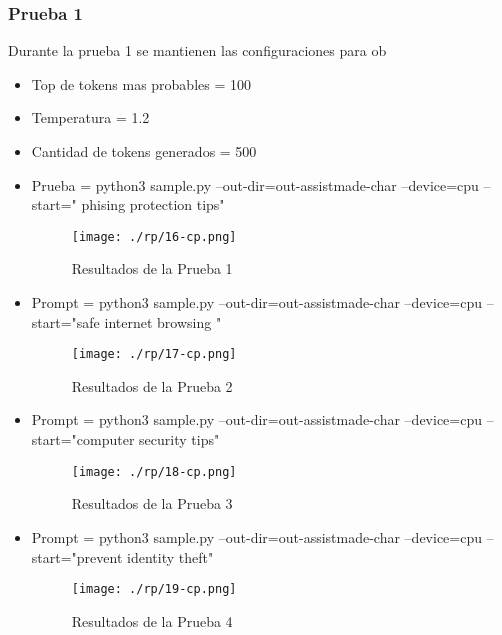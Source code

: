 \subsubsection{ Prueba 1}\label{section:Validación del prototipo}
Durante la prueba 1 se mantienen las configuraciones para ob
    \begin{itemize}
        \item   Top de tokens mas probables = 100
        \item   Temperatura = 1.2
        \item   Cantidad de tokens generados = 500
        \item   Prueba = python3 sample.py --out-dir=out-assistmade-char --device=cpu --start=" phising protection tips"
    
\begin{figure}[H]
   \centering %
       \texttt{[image: ./rp/16-cp.png]} 
   \caption{Resultados de la Prueba 1\cite{}}
  \label{figure:Prueba1}  %
\end{figure}
        \item   Prompt = python3 sample.py --out-dir=out-assistmade-char --device=cpu --start="safe internet browsing "
\begin{figure}[H]
   \centering %
       \texttt{[image: ./rp/17-cp.png]} 
   \caption{Resultados de la Prueba 2\cite{}}
  \label{figure:Prueba2}  %
\end{figure}
        \item   Prompt = python3 sample.py –out-dir=out-assistmade-char --device=cpu --start="computer security tips"
\begin{figure}[H]
   \centering %
       \texttt{[image: ./rp/18-cp.png]} 
   \caption{Resultados de la Prueba 3\cite{}}
  \label{figure:Resultado prueba 3}  %
\end{figure}
        \item   Prompt = python3 sample.py --out-dir=out-assistmade-char --device=cpu --start="prevent identity theft"
\begin{figure}[H]
   \centering %
       \texttt{[image: ./rp/19-cp.png]} 
   \caption{Resultados de la Prueba 4\cite{}}
  \label{figure:Resultado prueba 4}  %
\end{figure}
\end{itemize}
